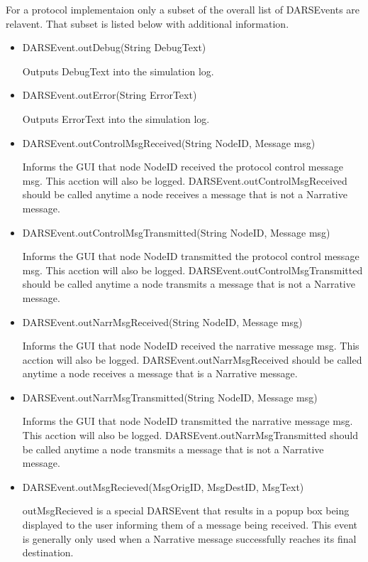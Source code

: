 \documentclass[a4paper,11pt,titlepage]{article}
\begin{document}
For a protocol implementaion only a subset of the overall list of DARSEvents are relavent. That subset is listed below with additional information.

\begin{itemize}
   \item DARSEvent.outDebug(String DebugText)

Outputs DebugText into the simulation log.

   \item DARSEvent.outError(String ErrorText)

Outputs ErrorText into the simulation log.

   \item DARSEvent.outControlMsgReceived(String NodeID, Message msg)

Informs the GUI that node NodeID received the protocol control message msg. This acction will also be logged.
DARSEvent.outControlMsgReceived should be called anytime a node receives a message that is not a Narrative message.

   \item DARSEvent.outControlMsgTransmitted(String NodeID, Message msg)

Informs the GUI that node NodeID transmitted the protocol control message msg. This acction will also be logged.
DARSEvent.outControlMsgTransmitted should be called anytime a node transmits a message that is not a Narrative message.

   \item DARSEvent.outNarrMsgReceived(String NodeID, Message msg)

Informs the GUI that node NodeID received the narrative message msg. This acction will also be logged.
DARSEvent.outNarrMsgReceived should be called anytime a node receives a message that is a Narrative message.

   \item DARSEvent.outNarrMsgTransmitted(String NodeID, Message msg)

Informs the GUI that node NodeID transmitted the narrative message msg. This acction will also be logged.
DARSEvent.outNarrMsgTransmitted should be called anytime a node transmits a message that is not a Narrative message.

   \item DARSEvent.outMsgRecieved(MsgOrigID, MsgDestID, MsgText)

outMsgRecieved is a special DARSEvent that results in a popup box being displayed to the user informing them of a message being received. This event is generally only used when a Narrative message successfully reaches its final destination.

\end{itemize}
\end{document}
